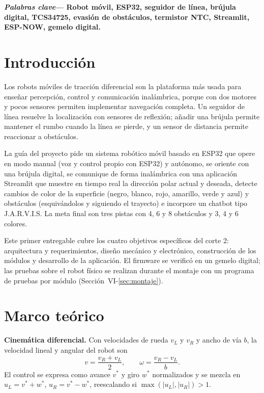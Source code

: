\documentclass[10pt,a4paper,twocolumn]{article}
\begin{document}
\vspace{0.2cm}
\noindent\textbf{\textit{Palabras clave}— Robot móvil, ESP32, seguidor de línea, brújula digital, TCS34725, evasión de obstáculos, termistor NTC, Streamlit, ESP-NOW, gemelo digital.}

\section{Introducción}
Los robots móviles de tracción diferencial son la plataforma más usada para enseñar percepción, control y comunicación inalámbrica, porque con dos motores y pocos sensores permiten implementar navegación completa. Un seguidor de línea resuelve la localización con sensores de reflexión; añadir una brújula permite mantener el rumbo cuando la línea se pierde, y un sensor de distancia permite reaccionar a obstáculos.

La guía del proyecto pide un sistema robótico móvil basado en ESP32 que opere en modo manual (voz y control propio con ESP32) y autónomo, se oriente con una brújula digital, se comunique de forma inalámbrica con una aplicación Streamlit que muestre en tiempo real la dirección polar actual y deseada, detecte cambios de color de la superficie (negro, blanco, rojo, amarillo, verde y azul) y obstáculos (esquivándolos y siguiendo el trayecto) e incorpore un chatbot tipo J.A.R.V.I.S. La meta final son tres pistas con 4, 6 y 8 obstáculos y 3, 4 y 6 colores.

Este primer entregable cubre los cuatro objetivos específicos del corte 2: arquitectura y requerimientos, diseño mecánico y electrónico, construcción de los módulos y desarrollo de la aplicación. El firmware se verificó en un gemelo digital; las pruebas sobre el robot físico se realizan durante el montaje con un programa de pruebas por módulo (Sección~VI-\ref{sec:montaje}).

\section{Marco teórico}
\textbf{Cinemática diferencial.} Con velocidades de rueda $v_L$ y $v_R$ y ancho de vía $b$, la velocidad lineal y angular del robot son
\begin{equation}
v=\frac{v_R+v_L}{2},\qquad \omega=\frac{v_R-v_L}{b}.
\end{equation}
El control se expresa como avance $v^\ast$ y giro $w^\ast$ normalizados y se mezcla en $u_L=v^\ast+w^\ast$, $u_R=v^\ast-w^\ast$, reescalando si $\max(|u_L|,|u_R|)>1$.
\end{document}
